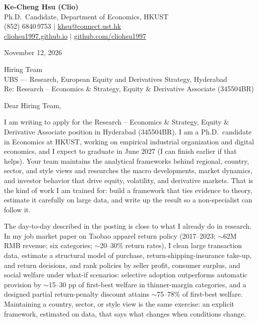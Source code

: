 \documentclass[11pt,letterpaper]{article}
\begin{document}
\noindent
{\bfseries Ke-Cheng Hsu (Clio)}\\
Ph.D.\ Candidate, Department of Economics, HKUST\\
(852) 6840\,9753 \quad $|$ \quad \href{mailto:khsu@connect.ust.hk}{khsu@connect.ust.hk}\\
\href{https://cliohsu1997.github.io/}{cliohsu1997.github.io} \quad $|$ \quad \href{https://github.com/cliohsu1997}{github.com/cliohsu1997}

\vspace{0.4em}
\noindent
November 12, 2026

\vspace{0.35em}
\noindent
Hiring Team\\
UBS --- Research, European Equity and Derivatives Strategy, Hyderabad\\
Re: Research -- Economics \& Strategy, Equity \& Derivative Associate (345504BR)

\vspace{0.2em}
Dear Hiring Team,

I am writing to apply for the Research -- Economics \& Strategy, Equity \& Derivative Associate position in Hyderabad (345504BR). I am a Ph.D.\ candidate in Economics at HKUST, working on empirical industrial organization and digital economics, and I expect to graduate in June 2027 (I can finish earlier if that helps). Your team maintains the analytical frameworks behind regional, country, sector, and style views and researches the macro developments, market dynamics, and investor behavior that drive equity, volatility, and derivative markets. That is the kind of work I am trained for: build a framework that ties evidence to theory, estimate it carefully on large data, and write up the result so a non-specialist can follow it.

The day-to-day described in the posting is close to what I already do in research. In my job market paper on Taobao apparel return policy (2017--2023; \(\sim\)62M RMB revenue; six categories; \(\sim\)20--30\% return rates), I clean large transaction data, estimate a structural model of purchase, return-shipping-insurance take-up, and return decisions, and rank policies by seller profit, consumer surplus, and social welfare under what-if scenarios: selective adoption outperforms automatic provision by \(\sim\)15--30 pp of first-best welfare in thinner-margin categories, and a designed partial return-penalty discount attains \(\sim\)75--78\% of first-best welfare. Maintaining a country, sector, or style view is the same exercise: an explicit framework, estimated on data, that says what changes when conditions change.
\end{document}
